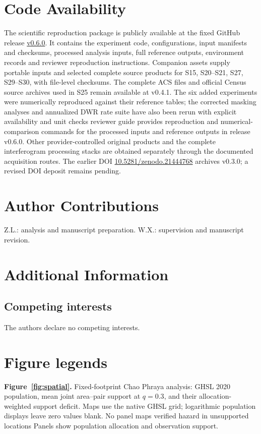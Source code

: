 \documentclass[pdflatex,sn-nature]{sn-jnl}
\providecommand{\DIFadd}[1]{{\protect\color{blue} \sf #1}} %
\providecommand{\DIFdel}[1]{{\protect\color{red} \scriptsize #1}} %
\providecommand{\DIFaddbegin}{} %
\providecommand{\DIFaddend}{} %
\providecommand{\DIFdelbegin}{} %
\providecommand{\DIFdelend}{} %
\begin{document}
\section*{Code Availability}
The scientific reproduction package is publicly available at the fixed GitHub release \href{https://github.com/niubisile-wq/openinsar-observability-bias/releases/tag/v0.6.0}{v0.6.0}. It contains the experiment code, configurations, input manifests and checksums, processed analysis inputs, full reference outputs, environment records and reviewer reproduction instructions. Companion assets supply portable inputs and selected complete source products for S15, S20--S21, S27, S29--S30, with file-level checksums. The complete ACS files and official Census source archives used in S25 remain available at v0.4.1. The \DIFdelbegin \DIFdel{six added experiments were numerically reproduced against their reference tables; the corrected masking analyses and annualized DWR rate suite have also been rerun with explicit availability and unit checks}\DIFdelend \DIFaddbegin \DIFadd{reviewer guide provides reproduction and numerical-comparison commands for the processed inputs and reference outputs in release v0.6.0}\DIFaddend . Other provider-controlled original products and the complete interferogram processing stacks are obtained separately through the documented acquisition routes. The earlier DOI \href{https://doi.org/10.5281/zenodo.21444768}{10.5281/zenodo.21444768} archives v0.3.0; a revised DOI deposit remains pending.
\def\bibfont{\small}

\section*{Author Contributions}
Z.L.: analysis and manuscript preparation. W.X.: supervision and manuscript revision.
\section*{Additional Information}
\subsection*{Competing interests}
The authors declare no competing interests.
\section*{Figure legends}

\noindent\textbf{Figure~\ref{fig:spatial}.} Fixed-footprint Chao Phraya analysis: GHSL 2020 population, mean joint area--pair support at $q=0.3$, and their allocation-weighted support deficit. Maps use the native GHSL grid; logarithmic population displays leave zero values blank. \DIFdelbegin \DIFdel{No panel maps verified hazard in unsupported locations}\DIFdelend \DIFaddbegin \DIFadd{Panels show population allocation and observation support}\DIFaddend .
\end{document}
